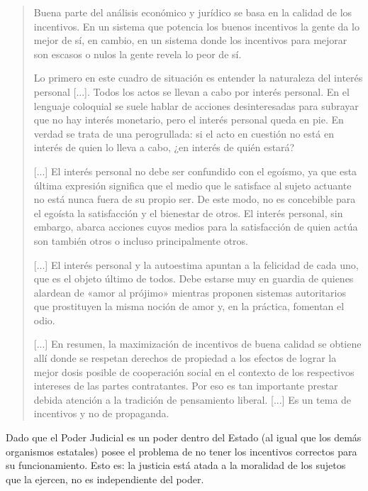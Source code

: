 \documentclass[12pt,a4paper,twoside]{book}
\begin{document}
\begin{quotation}
Buena parte del análisis económico y jurídico se basa en la calidad de los incentivos. En un sistema que potencia los buenos incentivos la gente da lo mejor de sí, en cambio, en un sistema donde los incentivos para mejorar son escasos o nulos la gente revela lo peor de sí.

Lo primero en este cuadro de situación es entender la naturaleza del interés personal [...]. Todos los actos se llevan a cabo por interés personal. En el lenguaje coloquial se suele hablar de acciones desinteresadas para subrayar que no hay interés monetario, pero el interés personal queda en pie. En verdad se trata de una perogrullada: si el acto en cuestión no está en interés de quien lo lleva a cabo, ¿en interés de quién estará?

[...] El interés personal no debe ser confundido con el egoísmo, ya que esta última expresión significa que el medio que le satisface al sujeto actuante no está nunca fuera de su propio ser. De este modo, no es concebible para el egoísta la satisfacción y el bienestar de otros. El interés personal, sin embargo, abarca acciones cuyos medios para la satisfacción de quien actúa son también otros o incluso principalmente otros.

[...] El interés personal y la autoestima apuntan a la felicidad de cada uno, que es el objeto último de todos. Debe estarse muy en guardia de quienes alardean de «amor al prójimo» mientras proponen sistemas autoritarios que prostituyen la misma noción de amor y, en la práctica, fomentan el odio. 

[...] En resumen, la maximización de incentivos de buena calidad se obtiene allí donde se respetan derechos de propiedad a los efectos de lograr la mejor dosis posible de cooperación social en el contexto de los respectivos intereses de las partes contratantes. Por eso es tan importante prestar debida atención a la tradición de pensamiento liberal. [...] Es un tema de incentivos y no de propaganda. \cite{abl:incentivos}
\end{quotation}

Dado que el Poder Judicial es un poder dentro del Estado (al igual que los demás organismos estatales) posee el problema de no tener los incentivos correctos para su funcionamiento. Esto es: la justicia está atada a la moralidad de los sujetos que la ejercen, no es independiente del poder.
\end{document}
